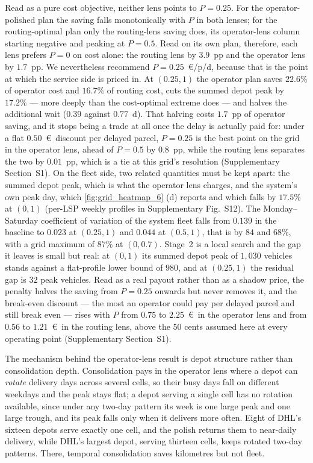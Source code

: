 \documentclass[preprint,12pt,authoryear]{elsarticle}
\begin{document}
Read as a pure cost objective, neither lens points to $P = 0.25$. For the operator-polished plan the saving falls monotonically with $P$ in both lenses; for the routing-optimal plan only the routing-lens saving does, its operator-lens column starting negative and peaking at $P = 0.5$. Read on its own plan, therefore, each lens prefers $P = 0$ on cost alone: the routing lens by $3.9$~pp and the operator lens by $1.7$~pp. We nevertheless recommend $P = 0.25$~\euro/p/d, because that is the point at which the service side is priced in. At $(0.25, 1)$ the operator plan saves $22.6\%$ of operator cost and $16.7\%$ of routing cost, cuts the summed depot peak by $17.2\%$ --- more deeply than the cost-optimal extreme does --- and halves the additional wait ($0.39$ against $0.77$~d). That halving costs $1.7$~pp of operator saving, and it stops being a trade at all once the delay is actually paid for: under a flat $0.50$~\euro\ discount per delayed parcel, $P = 0.25$ is the best point on the grid in the operator lens, ahead of $P = 0.5$ by $0.8$~pp, while the routing lens separates the two by $0.01$~pp, which is a tie at this grid's resolution (Supplementary Section~S1). On the fleet side, two related quantities must be kept apart: the summed depot peak, which is what the operator lens charges, and the system's own peak day, which \autoref{fig:grid_heatmap_6} (d) reports and which falls by $17.5\%$ at $(0, 1)$ (per-LSP weekly profiles in Supplementary Fig.~S12).
The Monday--Saturday coefficient of variation of the system fleet falls from $0.139$ in the baseline to $0.023$ at $(0.25, 1)$ and $0.044$ at $(0.5, 1)$, that is by $84$ and $68\%$, with a grid maximum of $87\%$ at $(0, 0.7)$. Stage~2 is a local search and the gap it leaves is small but real: at $(0, 1)$ its summed depot peak of $1{,}030$ vehicles stands against a flat-profile lower bound of $980$, and at $(0.25, 1)$ the residual gap is $32$ peak vehicles. Read as a real payout rather than as a shadow price, the penalty halves the saving from $P = 0.25$ onwards but never removes it, and the break-even discount --- the most an operator could pay per delayed parcel and still break even --- rises with $P$ from $0.75$ to $2.25$~\euro\ in the operator lens and from $0.56$ to $1.21$~\euro\ in the routing lens, above the $50$ cents assumed here at every operating point (Supplementary Section~S1).

The mechanism behind the operator-lens result is depot structure rather than consolidation depth. Consolidation pays in the operator lens where a depot can \emph{rotate} delivery days across several cells, so their busy days fall on different weekdays and the peak stays flat; a depot serving a single cell has no rotation available, since under any two-day pattern its week is one large peak and one large trough, and its peak falls only when it delivers more often. Eight of DHL's sixteen depots serve exactly one cell, and the polish returns them to near-daily delivery, while DHL's largest depot, serving thirteen cells, keeps rotated two-day patterns. There, temporal consolidation saves kilometres but not fleet.
\end{document}
